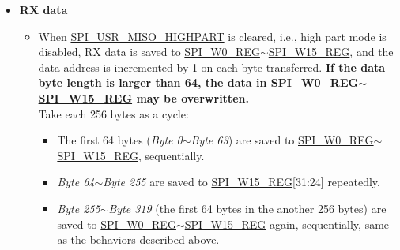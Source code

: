 \documentclass[main\_\_EN.tex]{subfiles}
\begin{document}
\begin{itemize}
\begin{itemize}
        \begin{itemize}
            \item The first 32 bytes (\emph{Byte 0}$\sim$\emph{Byte 31}) are read from \hyperref[regdesc:SPIW8REG]{SPI\_W8\_REG}$\sim$\hyperref[regdesc:SPIW15REG]{SPI\_W15\_REG}, sequentially.
            \item \emph{Byte 32}$\sim$\emph{Byte 255} are read from \hyperref[regdesc:SPIW15REG]{SPI\_W15\_REG}[31:24] repeatedly.
            \item The other bytes (\emph{Byte 256} and \emph{Byte 257}) are read from \hyperref[regdesc:SPIW8REG]{SPI\_W8\_REG}[7:0] and \hyperref[regdesc:SPIW8REG]{SPI\_W8\_REG}[15:8] again, sequentially. The logic is:
            \begin{itemize}
                \item The address to read data for \emph{Byte 256} is the result of (256 \% 32 = 0), i.e., \hyperref[regdesc:SPIW8REG]{SPI\_W8\_REG}[7:0].
                \item The address to read data for \emph{Byte 257} is the result of (257 \% 32 = 1), i.e., \hyperref[regdesc:SPIW8REG]{SPI\_W8\_REG}[15:8].
            \end{itemize}
        \end{itemize}
    \end{itemize}

    \item \textbf{RX data}
    \begin{itemize}
        \item When \hyperref[fielddesc:SPIUSRMISOHIGHPART]{SPI\_USR\_MISO\_HIGHPART} is cleared, i.e., high part mode is disabled, RX data is saved to \hyperref[regdesc:SPIW0REG]{SPI\_W0\_REG}$\sim$\hyperref[regdesc:SPIW15REG]{SPI\_W15\_REG}, and the data address is incremented by 1 on each byte transferred. \textbf{If the data byte length is larger than 64, the data in \hyperref[regdesc:SPIW0REG]{SPI\_W0\_REG}$\sim$\hyperref[regdesc:SPIW15REG]{SPI\_W15\_REG} may be overwritten.} \\
        Take each 256 bytes as a cycle:
        \begin{itemize}
            \item The first 64 bytes (\emph{Byte 0}$\sim$\emph{Byte 63}) are saved to \hyperref[regdesc:SPIW0REG]{SPI\_W0\_REG}$\sim$\hyperref[regdesc:SPIW15REG]{SPI\_W15\_REG}, sequentially.
            \item \emph{Byte 64}$\sim$\emph{Byte 255} are saved to \hyperref[regdesc:SPIW15REG]{SPI\_W15\_REG}[31:24] repeatedly.
            \item \emph{Byte 255}$\sim$\emph{Byte 319} (the first 64 bytes in the another 256 bytes) are saved to \hyperref[regdesc:SPIW0REG]{SPI\_W0\_REG}$\sim$\hyperref[regdesc:SPIW15REG]{SPI\_W15\_REG} again, sequentially, same as the behaviors described above.
        \end{itemize}


\end{itemize}
\end{itemize}
\end{document}
